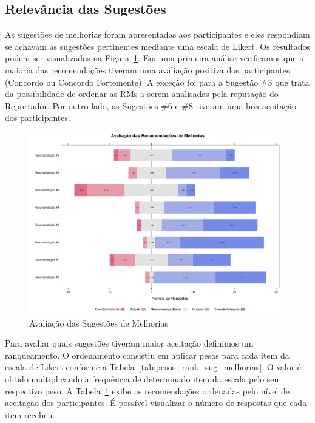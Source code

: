 \subsection{Relevância das Sugestões}
\label{sub:sug_melhorias_resultados_relevancia}

As sugestões de melhorias foram apresentadas aos participantes e eles respondiam
se achavam as sugestões pertinentes mediante uma escala de Likert. Os resultados
podem ser visualizados na Figura~\ref{fig:plot_likert_avaliacao_sug_melhorias}.
Em uma primeira análise verificamos que a maioria das recomendações tiveram uma
avaliação positiva dos participantes (Concordo ou Concordo Fortemente). A
exceção foi para a Sugestão \#3 que trata da possibilidade de ordenar as RMs a
serem analisadas pela reputação do Reportador. Por outro lado, as Sugestões \#6
e \#8 tiveram uma boa aceitação dos participantes.

\begin{figure}[htpb]
    \centering
    \includegraphics[width=1.1\linewidth]{chapter-sugestoes-melhorias-fgrm/img/plot_likert_avaliacao_sug_melhorias.pdf}
    \caption{Avaliação das Sugestões de Melhorias}
\label{fig:plot_likert_avaliacao_sug_melhorias}
\end{figure}

Para avaliar quais sugestões tiveram maior aceitação definimos um ranqueamento.
O ordenamento consistiu em aplicar pesos para cada item da escala de Likert
conforme a Tabela~\ref{tab:pesos_rank_sug_melhorias}. O valor é obtido
multiplicando a frequência de determinado item da escala pelo seu respectivo
peso. A Tabela~\ref{fig:plot_likert_avaliacao_sug_melhorias} exibe as
recomendações ordenadas pelo nível de aceitação dos participantes. É possível
visualizar o número de respostas que cada item recebeu.

